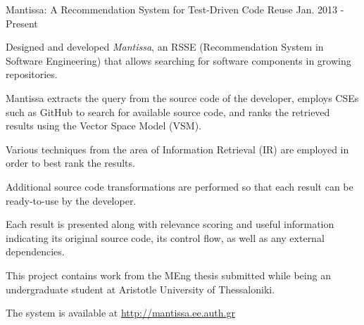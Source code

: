 \begin{cventries}
  \cventry
    {Mantissa: A Recommendation System for Test-Driven Code Reuse} %
	{}
	{}
    {Jan. 2013 - Present} %
    {
      \begin{cvitems} %
        \item {Designed and developed \textit{Mantissa}, an RSSE (Recommendation System in Software Engineering) that allows searching for software components in growing repositories.} 
        \item {Mantissa extracts the query from the source code of the developer, employs CSEs such as GitHub to search for available source code, and ranks the retrieved results using the Vector Space Model (VSM).}
        \item {Various techniques from the area of Information Retrieval (IR) are employed in order to best rank the results.}
		\item {Additional source code transformations are performed so that each result can be ready-to-use by the developer.}
		\item {Each result is presented along with relevance scoring and useful information indicating its original source code, its control flow, as well as any external dependencies.}
		\item {This project contains work from the MEng thesis submitted while being an undergraduate student at Aristotle University of Thessaloniki.}
		\item {The system is available at \url{http://mantissa.ee.auth.gr}}
      \end{cvitems}
    }
\end{cventries}
